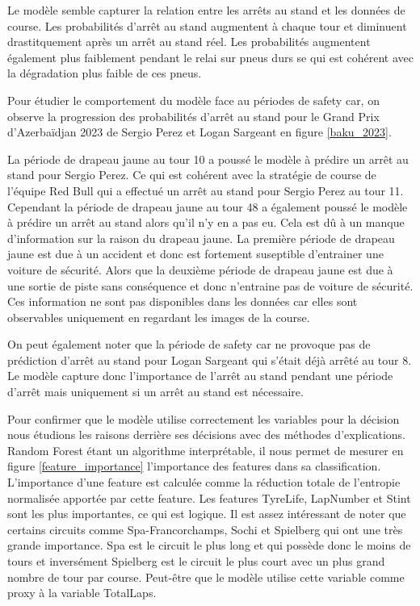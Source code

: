 Le modèle semble capturer la relation entre les arrêts au stand et les données de course.
Les probabilités d'arrêt au stand augmentent à chaque tour et diminuent drastitquement après un arrêt au stand réel.
Les probabilités augmentent également plus faiblement pendant le relai sur pneus durs se qui est cohérent avec la dégradation plus faible de ces pneus.

Pour étudier le comportement du modèle face au périodes de safety car, on observe la progression des probabilités d'arrêt au stand pour le Grand Prix d'Azerbaïdjan 2023 de Sergio Perez et Logan Sargeant en figure \ref{baku_2023}.


La période de drapeau jaune au tour 10 a poussé le modèle à prédire un arrêt au stand pour Sergio Perez.
Ce qui est cohérent avec la stratégie de course de l'équipe Red Bull qui a effectué un arrêt au stand pour Sergio Perez au tour 11.
Cependant la période de drapeau jaune au tour 48 a également poussé le modèle à prédire un arrêt au stand alors qu'il n'y en a pas eu.
Cela est dû à un manque d'information sur la raison du drapeau jaune. La première période de drapeau jaune est due à un accident et donc est fortement suseptible d'entrainer une voiture de sécurité.
Alors que la deuxième période de drapeau jaune est due à une sortie de piste sans conséquence et donc n'entraine pas de voiture de sécurité.
Ces information ne sont pas disponibles dans les données car elles sont observables uniquement en regardant les images de la course.

On peut également noter que la période de safety car ne provoque pas de prédiction d'arrêt au stand pour Logan Sargeant qui s'était déjà arrêté au tour 8.
Le modèle capture donc l'importance de l'arrêt au stand pendant une période d'arrêt mais uniquement si un arrêt au stand est nécessaire.

Pour confirmer que le modèle utilise correctement les variables pour la décision nous étudions les raisons derrière ses décisions avec des méthodes d'explications.
Random Forest étant un algorithme interprétable, il nous permet de mesurer en figure \ref{feature_importance} l'importance des features dans sa classification.
L'importance d'une feature est calculée comme la réduction totale de l'entropie normalisée apportée par cette feature.
Les features TyreLife, LapNumber et Stint sont les plus importantes, ce qui est logique.
Il est assez intéressant de noter que certains circuits comme Spa-Francorchamps, Sochi et Spielberg qui ont une très grande importance.
Spa est le circuit le plus long et qui possède donc le moins de tours et inversément Spielberg est le circuit le plus court avec un plus grand nombre de tour par course.
Peut-être que le modèle utilise cette variable comme proxy à la variable TotalLaps.

